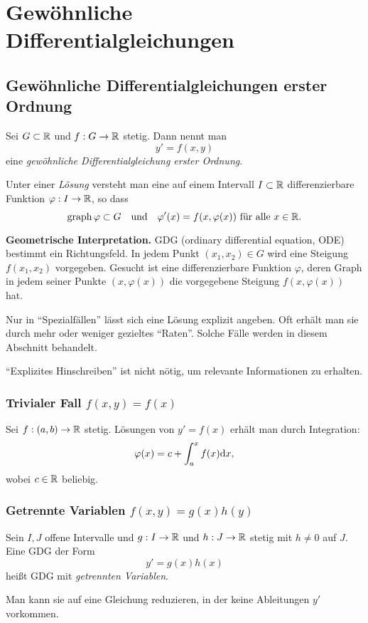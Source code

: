 \section{Gewöhnliche Differentialgleichungen}
\subsection{Gewöhnliche Differentialgleichungen erster Ordnung}
Sei $G \subset \mathbb{R}$ und $f:G \to \mathbb{R}$ stetig. Dann nennt man
\[ y' = f(x,y) \]
eine \emph{gewöhnliche Differentialgleichung erster  Ordnung}.

Unter einer \emph{Lösung} versteht man eine auf einem Intervall $I \subset
\mathbb{R}$ differenzierbare Funktion $\varphi:I \to \mathbb{R}$, so dass
\[ \operatorname{graph} \varphi \subset G \quad \text{und} \quad \varphi'(x) =
  f(x,\varphi(x)) \text{ für alle } x \in \mathbb{R}. \]

\textbf{Geometrische Interpretation.} GDG (ordinary differential equation, ODE)
bestimmt ein Richtungsfeld. In jedem Punkt $(x_1, x_2) \in G$ wird eine Steigung
$f(x_1,x_2)$ vorgegeben. Gesucht ist eine differenzierbare Funktion $\varphi$,
deren Graph in jedem seiner Punkte $(x,\varphi(x))$ die vorgegebene Steigung
$f(x,\varphi(x))$ hat.

Nur in ``Spezialfällen'' lässt sich eine Lösung explizit angeben. Oft erhält man
sie durch mehr oder weniger gezieltes ``Raten''. Solche Fälle werden in diesem
Abschnitt behandelt.

``Explizites Hinschreiben'' ist nicht nötig, um relevante Informationen zu
erhalten.

\subsubsection{Trivialer Fall \texorpdfstring{$f(x,y)=f(x)$}{f(x,y)=f(x)}}
Sei $f:(a,b) \to \mathbb{R}$ stetig. Lösungen von $y' = f(x)$ erhält man durch
Integration:
\[ \varphi(x) = c + \int_a^x f(x) \mathrm{d} x, \]
wobei $c \in \mathbb{R}$ beliebig.

\subsubsection{Getrennte Variablen \texorpdfstring{$f(x,y) = g(x)h(y)$}{f(x,y) =
    g(x)h(y}}
Sein $I,J$ offene Intervalle und $g:I \to \mathbb{R}$ und $h:J \to \mathbb{R}$ stetig mit
$h \ne 0$ auf $J$. Eine GDG der Form
\[ y' = g(x) h(x) \]
heißt GDG mit \emph{getrennten Variablen}.

Man kann sie auf eine Gleichung reduzieren, in der keine Ableitungen $y'$
vorkommen.

